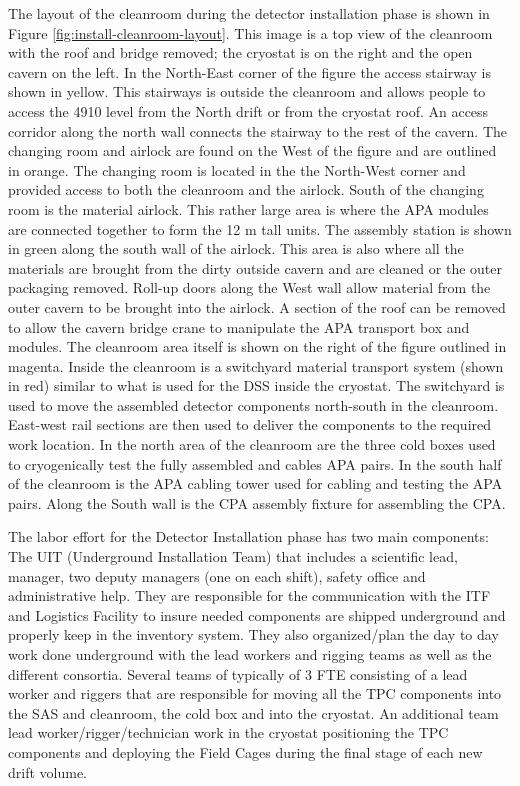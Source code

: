 The layout of the cleanroom during the detector installation phase is shown in Figure \ref{fig:install-cleanroom-layout}. This image is a top view of the cleanroom with the roof and bridge removed; the cryostat is on the right and the open cavern on the left. In the North-East corner of the figure the access stairway is shown in yellow. This stairways is outside the cleanroom and allows people to access the 4910 level from the North drift or from the cryostat roof. An access corridor along the north wall connects the stairway to the rest of the cavern. The changing room and airlock are found on the West of the figure and are outlined in orange. The changing room is located in the the North-West corner and provided access to both the cleanroom and the airlock. South of the changing room is the material airlock. This rather large area is where the APA modules are connected together to form the 12 \si{m} tall units. The assembly station is shown in green along the south wall of the airlock. This area is also where all the materials are brought from the dirty outside cavern and are cleaned or the outer packaging removed. Roll-up doors along the West wall allow material from the outer cavern to be brought into the airlock. A section of the roof can be removed to allow the cavern bridge crane to manipulate the APA transport box and modules. The cleanroom area itself is shown on the right of the figure outlined in magenta. Inside the cleanroom is a switchyard material transport system (shown in red) similar to what is used for the DSS inside the cryostat. The switchyard is used to move the assembled detector components north-south in the cleanroom. East-west rail sections are then used to deliver the components to the required work location. In the north area of the cleanroom are the three cold boxes used to cryogenically test the fully assembled and cables APA pairs. In the south half of the cleanroom is the APA cabling tower used for cabling and testing the APA pairs. Along the South wall is the CPA assembly fixture for assembling the CPA. 

The labor effort for the Detector Installation phase has two main components: 
The UIT (Underground Installation Team) that includes a scientific lead, manager, two deputy managers (one on each shift), safety office and administrative help. They are responsible for the communication with the ITF and Logistics Facility to insure needed components are shipped underground and properly keep in the inventory system.  They also organized/plan the day to day work done underground with the lead workers and rigging teams as well as the different consortia.  Several teams of typically of 3 FTE consisting of a lead worker and riggers that are responsible for moving all the TPC components into the SAS and cleanroom, the cold box and into the cryostat. An additional team lead worker/rigger/technician work in the cryostat positioning the TPC components and deploying the Field Cages during the final stage of each new drift volume. 

